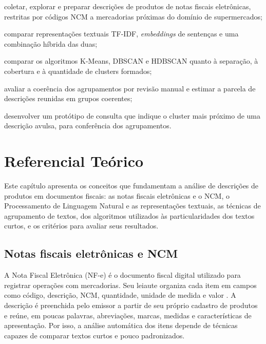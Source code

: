 \documentclass[english,brazilian]{UNISINOSmonografia}
\begin{document}
\begin{alineas}
    \item coletar, explorar e preparar descrições de produtos de notas fiscais eletrônicas, restritas por códigos NCM a mercadorias próximas do domínio de supermercados;
    \item comparar representações textuais TF-IDF, \textit{embeddings} de sentenças e uma combinação híbrida das duas;
    \item comparar os algoritmos K-Means, DBSCAN e HDBSCAN quanto à separação, à cobertura e à quantidade de clusters formados;
    \item avaliar a coerência dos agrupamentos por revisão manual e estimar a parcela de descrições reunidas em grupos coerentes;
    \item desenvolver um protótipo de consulta que indique o cluster mais próximo de uma descrição avulsa, para conferência dos agrupamentos.
\end{alineas}




\chapter{Referencial Teórico}
\label{cap:referencial}

Este capítulo apresenta os conceitos que fundamentam a análise de descrições de produtos em documentos fiscais: as notas fiscais eletrônicas e o NCM, o Processamento de Linguagem Natural e as representações textuais, as técnicas de agrupamento de textos, dos algoritmos utilizados às particularidades dos textos curtos, e os critérios para avaliar seus resultados.

\section{Notas fiscais eletrônicas e NCM}

A Nota Fiscal Eletrônica (NF-e) é o documento fiscal digital utilizado para registrar operações com mercadorias. Seu leiaute organiza cada item em campos como código, descrição, NCM, quantidade, unidade de medida e valor \cite{portalnfe-moc}. A descrição é preenchida pelo emissor a partir de seu próprio cadastro de produtos e reúne, em poucas palavras, abreviações, marcas, medidas e características de apresentação. Por isso, a análise automática dos itens depende de técnicas capazes de comparar textos curtos e pouco padronizados.
\end{document}
